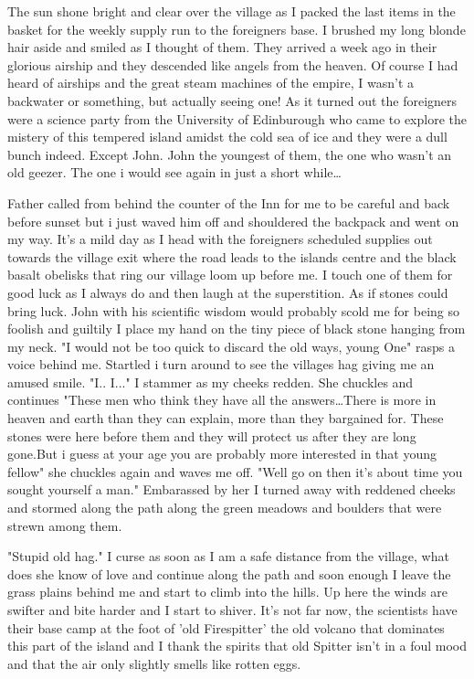The sun shone bright and clear over the village as I packed the last items in the basket for the weekly supply run to the foreigners base. I brushed my long blonde hair aside and smiled as I thought of them. They arrived a week ago in their glorious airship and they descended like angels from the heaven. Of course I had heard of airships and the great steam machines of the empire, I wasn't a backwater or something, but actually seeing one! As it turned out the foreigners were a science party from the University of Edinburough who came to explore the mistery of this tempered island amidst the cold sea of ice and they were a dull bunch indeed. Except John. John the youngest of them, the one who wasn't an old geezer. The one i would see again in just a short while\dots

\newscene

Father called from behind the counter of the Inn for me to be careful and back before sunset but i just waved him off and shouldered the backpack and went on my way. It's a mild day as I head with the foreigners scheduled supplies out towards the village exit where the road leads to the islands centre and the black basalt obelisks that ring our village loom up before me. I touch one of them for good luck as I always do and then laugh at the superstition. As if stones could bring luck. John with his scientific wisdom would probably scold me for being so foolish and guiltily I place my hand on the tiny piece of black stone hanging from my neck. "I would not be too quick to discard the old ways, young One" rasps a voice behind me. Startled i turn around to see the villages hag giving me an amused smile. "I.. I..." I stammer as my cheeks redden. She chuckles and continues "These men who think they have all the answers\dots There is more in heaven and earth than they can explain, more than they bargained for. These stones were here before them and they will protect us after they are long gone.But i guess at your age you are probably more interested in that young fellow" she chuckles again and waves me off. "Well go on then it's about time you sought yourself a man." Embarassed by her I turned away with reddened cheeks and stormed along the path along the green meadows and boulders that were strewn among them.

"Stupid old hag." I curse as soon as I am a safe distance from the village, what does she know of love and continue along the path and soon enough I leave the grass plains behind me and start to climb into the hills. Up here the winds are swifter and bite harder and I start to shiver. It's not far now, the scientists have their base camp at the foot of 'old Firespitter' the old volcano that dominates this part of the island and I thank the spirits that old Spitter isn't in a foul mood and that the air only slightly smells like rotten eggs.

